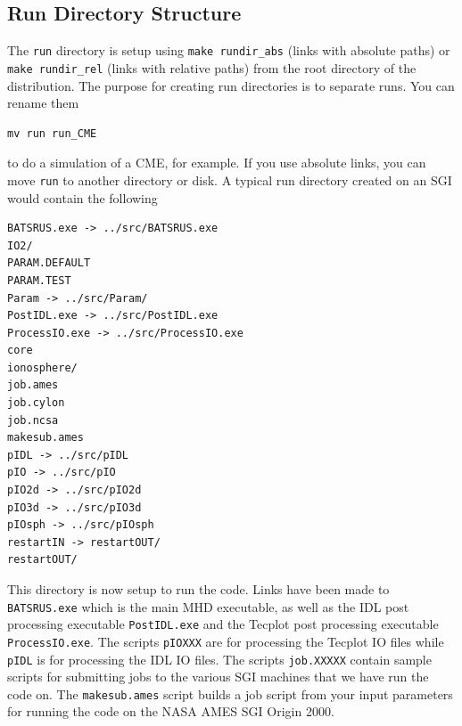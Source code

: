 \subsection{Run  Directory Structure \label{section:run_dir}}

The {\tt run} directory is setup using {\tt make rundir\_abs} (links with absolute
paths) or  {\tt make rundir\_rel} (links with relative
paths) from the root directory of
the distribution. 
The purpose for creating run directories is to separate runs.  You can rename them
\begin{verbatim}
mv run run_CME
\end{verbatim}
to do a simulation of a CME, for example.  
If you use absolute links, you can move {\tt run} to another
directory or disk.
A typical run directory created on an SGI would
contain the following

\begin{verbatim} 
BATSRUS.exe -> ../src/BATSRUS.exe             
IO2/                                                 
PARAM.DEFAULT
PARAM.TEST                                           
Param -> ../src/Param/                         
PostIDL.exe -> ../src/PostIDL.exe             
ProcessIO.exe -> ../src/ProcessIO.exe         
core                                                
ionosphere/                                          
job.ames                                            
job.cylon                                           
job.ncsa                                            
makesub.ames                                        
pIDL -> ../src/pIDL                           
pIO -> ../src/pIO                             
pIO2d -> ../src/pIO2d                         
pIO3d -> ../src/pIO3d                         
pIOsph -> ../src/pIOsph                       
restartIN -> restartOUT/                             
restartOUT/                                          
\end{verbatim} 

This directory is now setup to run the code.  Links have been made to 
{\tt BATSRUS.exe} which is the main MHD executable, as well as the 
IDL post processing executable {\tt PostIDL.exe} and the Tecplot post 
processing executable {\tt ProcessIO.exe}.  The scripts {\tt pIOXXX}
are for processing the Tecplot IO files while {\tt pIDL} is for
processing the IDL IO files.  The scripts {\tt job.XXXXX} contain
sample scripts for submitting jobs to the various SGI machines that we
have run the code on.  The {\tt makesub.ames} script builds a job script from
your input parameters  for running the code on the NASA AMES SGI Origin 2000.

